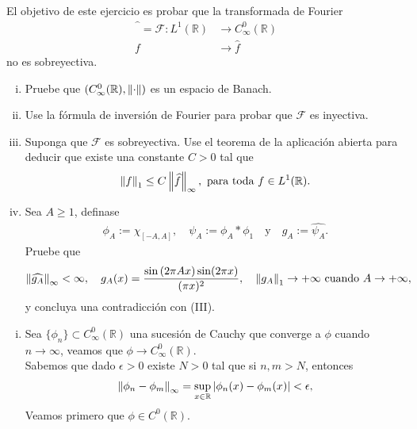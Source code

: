 \begin{homeworkProblem}
  El objetivo de este ejercicio es probar que la transformada de Fourier
  \begin{align*}
    \hat{\phantom{f}}=\mathcal{F}:L^{1}(\mathbb{R})&\to C^{0}_{\infty}(\mathbb{R})\\
    f&\to\hat{f}
  \end{align*}
  no es sobreyectiva.
  \begin{enumerate}[(i)]
    \item Pruebe que $(C^{0}_{\infty}(\mathbb{R}),\left\|\cdot\right\|)$ es un espacio de Banach.
    \item Use la fórmula de inversión de Fourier para probar que $\mathcal{F}$ es inyectiva.
    \item Suponga que $\mathcal{F}$ es sobreyectiva. Use el teorema de la aplicación abierta para deducir que existe una constante $C>0$ tal que
      \begin{align*}
        \left\|f\right\|_{1}\leq C\left\|\widehat{f}\right\|_{\infty},\text{ para toda $f\in L^1(\mathbb{R})$.}
      \end{align*}
    \item Sea $A\geq 1$, definase
      \begin{align*}
        \phi_{A}:=\chi_{[-A,A]},\quad\psi_{A}:=\phi_{A}*\phi_{1}\quad\text{y}\quad g_{A}:=\hat{\psi_{A}}.
      \end{align*}
      Pruebe que
      \begin{align*}
        \left\|\widehat{g_A}\right\|_{\infty}<\infty,\quad g_{A}(x)=\frac{\sin\left( 2\pi Ax \right)\sin(2\pi x)}{(\pi x)^2},\quad\left\|g_{A}\right\|_{1}\to +\infty\text{ cuando }A\to +\infty,
      \end{align*}
      y concluya una contradicción con (III).
  \end{enumerate}
  \begin{solution}
    \begin{enumerate}[(i)]
      \item Sea $\{\phi_{n}\}\subset C^{0}_{\infty}(\mathbb{R})$ una sucesión de Cauchy que converge a $\phi$ cuando $n\to \infty$, veamos que $\phi\to C^{0}_{\infty}(\mathbb{R})$.\\
        Sabemos que dado $\epsilon>0$ existe $N>0$ tal que si $n,m>N$, entonces
        \begin{align*}
          \left\|\phi_{n}-\phi_{m}\right\|_{\infty}=\sup_{x\in\mathbb{R}}|\phi_{n}(x)-\phi_{m}(x)|<\epsilon,
        \end{align*}
        Veamos primero que $\phi\in C^{0}(\mathbb{R})$.\\

\end{enumerate}
\end{solution}
\end{homeworkProblem}
